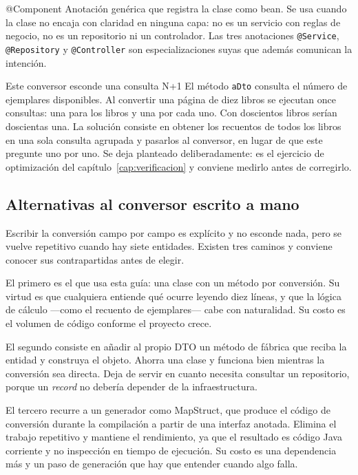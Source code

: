 \documentclass[11pt,a4paper,openany]{book}
\begin{document}
\begin{cajadefinicion}{@Component}
	Anotación genérica que registra la clase como bean. Se usa cuando la clase no encaja con claridad en ninguna capa: no es un servicio con reglas de negocio, no es un repositorio ni un controlador. Las tres anotaciones \texttt{@Service}, \texttt{@Repository} y \texttt{@Controller} son especializaciones suyas que además comunican la intención.
\end{cajadefinicion}

\begin{cajaadvertencia}{Este conversor esconde una consulta N+1}
	El método \texttt{aDto} consulta el número de ejemplares disponibles. Al convertir una página de diez libros se ejecutan once consultas: una para los libros y una por cada uno. Con doscientos libros serían doscientas una. La solución consiste en obtener los recuentos de todos los libros en una sola consulta agrupada y pasarlos al conversor, en lugar de que este pregunte uno por uno. Se deja planteado deliberadamente: es el ejercicio de optimización del capítulo~\ref{cap:verificacion} y conviene medirlo antes de corregirlo.
\end{cajaadvertencia}

\subsection{Alternativas al conversor escrito a mano}
\label{sec:alt-mapper}

Escribir la conversión campo por campo es explícito y no esconde nada, pero se vuelve repetitivo cuando hay siete entidades. Existen tres caminos y conviene conocer sus contrapartidas antes de elegir.

El primero es el que usa esta guía: una clase con un método por conversión. Su virtud es que cualquiera entiende qué ocurre leyendo diez líneas, y que la lógica de cálculo ---como el recuento de ejemplares--- cabe con naturalidad. Su costo es el volumen de código conforme el proyecto crece.

El segundo consiste en añadir al propio DTO un método de fábrica que reciba la entidad y construya el objeto. Ahorra una clase y funciona bien mientras la conversión sea directa. Deja de servir en cuanto necesita consultar un repositorio, porque un \emph{record} no debería depender de la infraestructura.

El tercero recurre a un generador como MapStruct, que produce el código de conversión durante la compilación a partir de una interfaz anotada. Elimina el trabajo repetitivo y mantiene el rendimiento, ya que el resultado es código Java corriente y no inspección en tiempo de ejecución. Su costo es una dependencia más y un paso de generación que hay que entender cuando algo falla.
\end{document}
